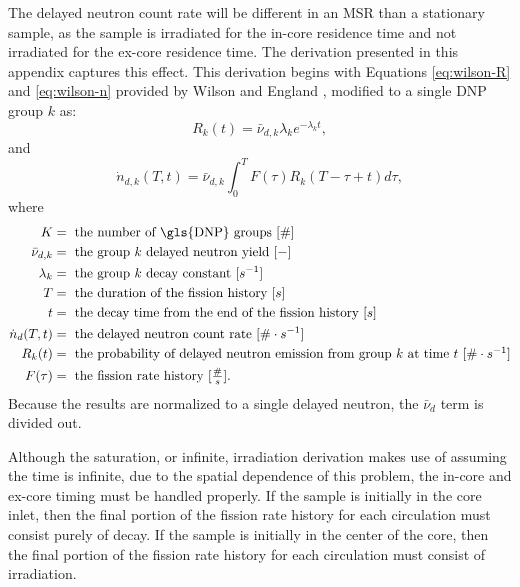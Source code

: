 \renewcommand{\theequation}{A\thechapter.\arabic{equation}}
\label{ref:appendixA}
The delayed neutron count rate will be different in an \gls{MSR} than a stationary sample, as the sample is irradiated for the in-core residence time and not irradiated for the ex-core residence time.
The derivation presented in this appendix captures this effect.
This derivation begins with Equations \eqref{eq:wilson-R} and \eqref{eq:wilson-n} provided by Wilson and England \cite{wilson2002delayed}, modified to a single \gls{DNP} group $k$ as:
\begin{equation}
    R_k(t) = \bar{\nu}_{d, k} \lambda_k e^{-\lambda_k t},
    \label{eq:wilson-R}
\end{equation}
and
\begin{equation}
    \dot{n}_{d,k}(T, t) = \bar{\nu}_{d,k} \int_{0}^{T} F(\tau) R_k(T-\tau+t) d\tau,
    \label{eq:wilson-n}
\end{equation}
where
\begin{align}
K &= \text{ the number of \gls{DNP} groups $[\#]$} \nonumber \\
\bar{\nu}_{d,k} &= \text{ the group $k$ delayed neutron yield $[-]$} \nonumber \\
\lambda_k &= \text{ the group $k$ decay constant $[s^{-1}]$} \nonumber \\
T &= \mbox{ the duration of the fission history [$s$]} \nonumber \\
t &= \mbox{ the decay time from the end of the fission history [$s$]} \nonumber \\
\dot{n}_{d}(T, t) &= \text{ the delayed neutron count rate $[\# \cdot s^{-1}]$} \nonumber \\
R_k(t) &= \mbox{ the probability of delayed neutron emission from group $k$ at time $t$ $[\# \cdot s^{-1}]$} \nonumber \\
F(\tau) &= \mbox{ the fission rate history [$\frac{\#}{s}$].} \nonumber
\end{align}
Because the results are normalized to a single delayed neutron, the $\bar{\nu}_d$ term is divided out.

Although the saturation, or infinite, irradiation derivation makes use of assuming the time is infinite, due to the spatial dependence of this problem, the in-core and ex-core timing must be handled properly.
If the sample is initially in the core inlet, then the final portion of the fission rate history for each circulation must consist purely of decay.
If the sample is initially in the center of the core, then the final portion of the fission rate history for each circulation must consist of irradiation.

